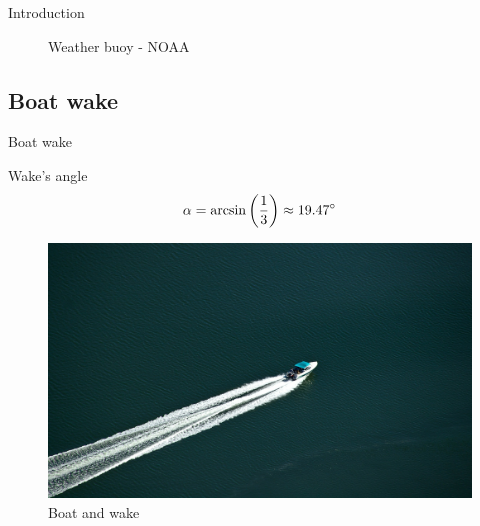 \documentclass{beamer}
\begin{document}
\begin{frame}{Introduction}
\begin{minipage}[b]{0.4\textwidth}
\begin{figure}
                        \caption{Weather buoy - NOAA\footnotemark[1]}
                    \end{figure}
                \end{minipage}

            \end{frame}

        \subsection{Boat wake}

            \begin{frame}{Boat wake}
                \centering
                \begin{minipage}{0.6\textwidth}
                    \begin{block}{Wake's angle}
                        \begin{equation}
                            \alpha = \arcsin\left(\frac{1}{3}\right) \approx 19.47 \degree
                        \end{equation}
                    \end{block}
                    \vspace{0.2cm}
                    \begin{figure}
                        \centering
                        \includegraphics[width=\textwidth,trim={0 0 17cm 14cm},clip]{imgs/motorboat}
                        \caption{Boat and wake}
                    \end{figure}
                \end{minipage}
            \end{frame}
        
\end{document}
